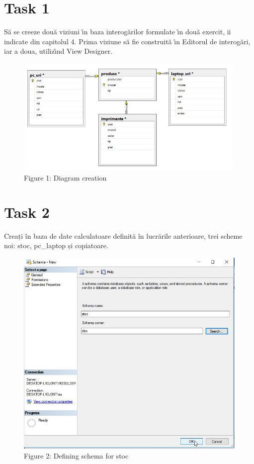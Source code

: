 \section{Task 1}
Să se creeze două viziuni ı̂n baza interogărilor formulate ı̂n două exercit, ii indicate din capitolul
4. Prima viziune să fie construită ı̂n Editorul de interogări, iar a doua, utilizı̂nd View Designer.
\begin{figure}[H]
	\centering
		\includegraphics[width=\linewidth]{screens/1.jpg}
		\caption*{Figure 1: Diagram creation}
		\label{}
	\endminipage\hfill
\end{figure}

\section{Task 2}
Creați în baza de date calculatoare definită în lucrările anterioare, trei scheme noi: stoc, pc\_laptop și copiatoare.

\begin{figure}[H]
	\centering
	\includegraphics[scale=0.4]{screens/3.jpg}
	\caption*{Figure 2: Defining schema for stoc}
	\label{}
\end{figure}

